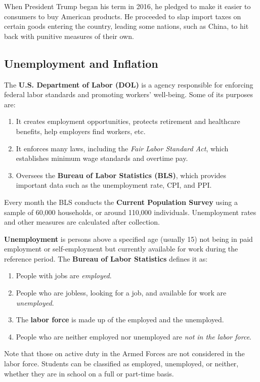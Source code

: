 \documentclass{article}
\begin{document}
      \begin{example}
        When President Trump began his term in 2016, he pledged to make it easier to consumers to buy American products. He proceeded to slap import taxes on certain goods entering the country, leading some nations, such as China, to hit back with punitive measures of their own. 
      \end{example}

  \subsection{Unemployment and Inflation}

    \begin{definition}
      The \textbf{U.S. Department of Labor (DOL)} is a agency responsible for enforcing federal labor standards and promoting workers' well-being. Some of its purposes are: 
      \begin{enumerate}
          \item It creates employment opportunities, protects retirement and healthcare benefits, help employers find workers, etc. 
          \item It enforces many laws, including the \textit{Fair Labor Standard Act}, which establishes minimum wage standards and overtime pay. 
          \item Oversees the \textbf{Bureau of Labor Statistics (BLS)}, which provides important data such as the unemployment rate, CPI, and PPI. 
      \end{enumerate}
      Every month the BLS conducts the \textbf{Current Population Survey} using a sample of 60,000 households, or around 110,000 individuals. Unemployment rates and other measures are calculated after collection. 
    \end{definition}

    \begin{definition}[Unemployment]
      \textbf{Unemployment} is persons above a specified age (usually 15) not being in paid employment or self-employment but currently available for work during the reference period. The \textbf{Bureau of Labor Statistics} defines it as: 
      \begin{enumerate}
        \item People with jobs are \textit{employed}. 
        \item People who are jobless, looking for a job, and available for work are \textit{unemployed}. 
        \item The \textbf{labor force} is made up of the employed and the unemployed. 
        \item People who are neither employed nor unemployed are \textit{not in the labor force}. 
      \end{enumerate}
      Note that those on active duty in the Armed Forces are not considered in the labor force. Students can be classified as employed, unemployed, or neither, whether they are in school on a full or part-time basis. 
    \end{definition}
\end{document}
